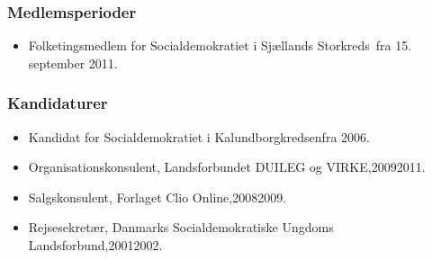 \documentclass[11pt, a4paper]{awesome-cv}
\begin{document}
\begin{cvletter}
\subsubsection*{Medlemsperioder}
\begin{itemize}
\item Folketingsmedlem for Socialdemokratiet i Sjællands Storkreds fra 15. september 2011.
\end{itemize}
\subsubsection*{Kandidaturer}
\begin{itemize}
\item Kandidat for Socialdemokratiet i Kalundborgkredsenfra 2006.
\end{itemize}
\begin{itemize}
\item Organisationskonsulent, Landsforbundet DUILEG og VIRKE,20092011.
\item Salgskonsulent, Forlaget Clio Online,20082009.
\item Rejsesekretær, Danmarks Socialdemokratiske Ungdoms Landsforbund,20012002.
\end{itemize}
\end{cvletter}
\end{document}
